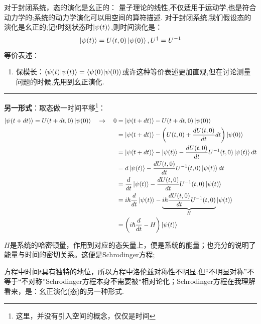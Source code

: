 \begin{postulate}[幺正演化]
对于封闭系统，态的演化是幺正的：
量子理论的线性,不仅适用于运动学,也是符合动力学的;系统的动力学演化可以用空间的算符描述.
   对于封闭系统,我们假设态的演化是幺正的;记$t$时刻状态时$\ket{\psi(t)}$,则时间演化是：
   \begin{equation}
    \ket{\psi(t)}=U(t,0)\ket{\psi(0)},U^\dagger=U^{-1}
   \end{equation}
   等价表述：\begin{enumerate}
    \item 保模长：$\braket{\psi(t)|\psi(t)}=\braket{\psi(0)|\psi(0)}$或许这种等价表述更加直观,但在讨论测量问题的时候,先用到幺正演化.
\end{enumerate}
    \par\vspace{2ex}
    \hrule
    \vspace{2ex}
   \textbf{另一形式}：取态做一时间平移\footnote{这里，并没有引入空间的概念，仅仅是时间}：
   \begin{equation}
    \begin{aligned}
        \ket{\psi(t+dt)}=U(t+dt,0)\ket{\psi(0)}\quad
        \to \quad0&=\ket{\psi(t+dt)}-U(t+dt,0)\ket{\psi(0)}
        \\&=
        \ket{\psi(t+dt)}-\left(U(t,0)+\frac{dU(t,0)}{dt}dt \right)\ket{\psi(0)}
        \\&=
        \ket{\psi(t+dt)}-\ket{\psi(t)}-\frac{dU(t,0)}{dt}U^{-1}(t,0)\ket{\psi(t)}dt
        \\&=
        d\ket{\psi(t)}-\frac{dU(t,0)}{dt}U^{-1}(t,0)\ket{\psi(t)}dt
        \\&=
        \frac{d}{dt}\ket{\psi(t)}-\frac{dU(t,0)}{dt}U^{-1}(t,0)\ket{\psi(t)}
        \\&=
        i\hbar\frac{d}{dt}\ket{\psi(t)}-
        \underbrace{i\hbar\frac{dU(t,0)}{dt}U^{-1}(t,0)}_{H}\ket{\psi(t)}
        \\&=\left(i\hbar\frac{d}{dt}-H\right)\ket{\psi(t)}
    \end{aligned}
   \end{equation}

\begin{tcolorbox}[colback=white!5,colframe=black!45]
$H$是系统的哈密顿量，作用到对应的态矢量上，便是系统的能量；也充分的说明了能量与时间的密切关系。这便是Schrodinger方程;
\vspace{2ex}\par
方程中时间$t$具有独特的地位，所以方程中洛伦兹对称性不明显.但“不明显对称”不等于“不对称”Schrodinger方程本身不需要被“相对论化；Schrodinger方程在我理解看来，是：幺正演化(态)的另一种形式.
\end{tcolorbox}
\end{postulate}

